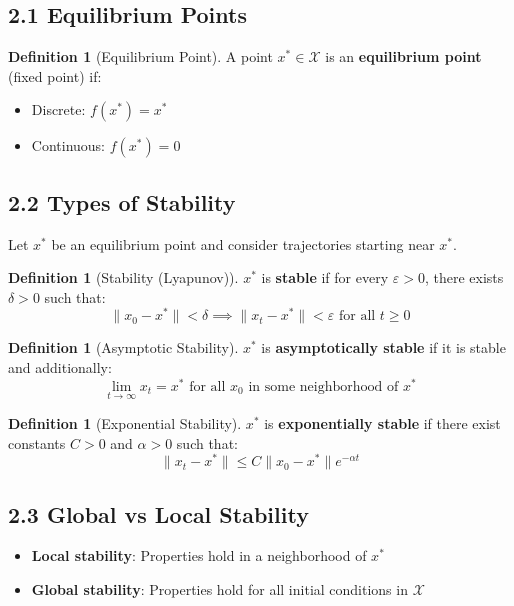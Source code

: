 \documentclass{amsart}
\theoremstyle{plain}
\theoremstyle{definition}
\newtheorem{definition}[theorem]{Definition}
\theoremstyle{remark}
\begin{document}
\subsection{2.1 Equilibrium Points}

\begin{definition}[Equilibrium Point]
A point $x^* \in \mathcal{X}$ is an \textbf{equilibrium point} (fixed point) if:
	\begin{itemize}
		\item Discrete: $f(x^*) = x^*$
		\item Continuous: $f(x^*) = 0$
	\end{itemize}
\end{definition}
\subsection{2.2 Types of Stability}

Let $x^*$ be an equilibrium point and consider trajectories starting near $x^*$.

\begin{definition}[Stability (Lyapunov)]
$x^*$ is \textbf{stable} if for every $\varepsilon > 0$, there exists $\delta > 0$ such that:
\[
\|x_0 - x^*\| < \delta \implies \|x_t - x^*\| < \varepsilon \text{ for all } t \geq 0
\]
\end{definition}
\begin{definition}[Asymptotic Stability]
$x^*$ is \textbf{asymptotically stable} if it is stable and additionally:
\[
\lim_{t \to \infty} x_t = x^* \text{ for all } x_0 \text{ in some neighborhood of } x^*
\]
\end{definition}
\begin{definition}[Exponential Stability]
$x^*$ is \textbf{exponentially stable} if there exist constants $C > 0$ and $\alpha > 0$ such that:
\[
\|x_t - x^*\| \leq C\|x_0 - x^*\|e^{-\alpha t}
\]
\end{definition}
\subsection{2.3 Global vs Local Stability}

\begin{itemize}
	\item \textbf{Local stability}: Properties hold in a neighborhood of $x^*$
	\item \textbf{Global stability}: Properties hold for all initial conditions in $\mathcal{X}$
\end{itemize}
\end{document}
